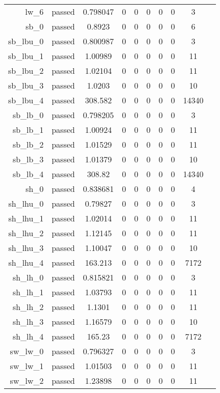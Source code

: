 \begin{longtable}{r|ccccccccc}
    lw\_6 & passed & 0.798047 & 0 & 0 & 0 & 0 & 0 & 3 \\
    sb\_0 & passed & 0.8923 & 0 & 0 & 0 & 0 & 0 & 6 \\
    sb\_lbu\_0 & passed & 0.800987 & 0 & 0 & 0 & 0 & 0 & 3 \\
    sb\_lbu\_1 & passed & 1.00989 & 0 & 0 & 0 & 0 & 0 & 11 \\
    sb\_lbu\_2 & passed & 1.02104 & 0 & 0 & 0 & 0 & 0 & 11 \\
    sb\_lbu\_3 & passed & 1.0203 & 0 & 0 & 0 & 0 & 0 & 10 \\
    sb\_lbu\_4 & passed & 308.582 & 0 & 0 & 0 & 0 & 0 & 14340 \\
    sb\_lb\_0 & passed & 0.798205 & 0 & 0 & 0 & 0 & 0 & 3 \\
    sb\_lb\_1 & passed & 1.00924 & 0 & 0 & 0 & 0 & 0 & 11 \\
    sb\_lb\_2 & passed & 1.01529 & 0 & 0 & 0 & 0 & 0 & 11 \\
    sb\_lb\_3 & passed & 1.01379 & 0 & 0 & 0 & 0 & 0 & 10 \\
    sb\_lb\_4 & passed & 308.82 & 0 & 0 & 0 & 0 & 0 & 14340 \\
    sh\_0 & passed & 0.838681 & 0 & 0 & 0 & 0 & 0 & 4 \\
    sh\_lhu\_0 & passed & 0.79827 & 0 & 0 & 0 & 0 & 0 & 3 \\
    sh\_lhu\_1 & passed & 1.02014 & 0 & 0 & 0 & 0 & 0 & 11 \\
    sh\_lhu\_2 & passed & 1.12145 & 0 & 0 & 0 & 0 & 0 & 11 \\
    sh\_lhu\_3 & passed & 1.10047 & 0 & 0 & 0 & 0 & 0 & 10 \\
    sh\_lhu\_4 & passed & 163.213 & 0 & 0 & 0 & 0 & 0 & 7172 \\
    sh\_lh\_0 & passed & 0.815821 & 0 & 0 & 0 & 0 & 0 & 3 \\
    sh\_lh\_1 & passed & 1.03793 & 0 & 0 & 0 & 0 & 0 & 11 \\
    sh\_lh\_2 & passed & 1.1301 & 0 & 0 & 0 & 0 & 0 & 11 \\
    sh\_lh\_3 & passed & 1.16579 & 0 & 0 & 0 & 0 & 0 & 10 \\
    sh\_lh\_4 & passed & 165.23 & 0 & 0 & 0 & 0 & 0 & 7172 \\
    sw\_lw\_0 & passed & 0.796327 & 0 & 0 & 0 & 0 & 0 & 3 \\
    sw\_lw\_1 & passed & 1.01503 & 0 & 0 & 0 & 0 & 0 & 11 \\
    sw\_lw\_2 & passed & 1.23898 & 0 & 0 & 0 & 0 & 0 & 11 \\

\end{longtable}
